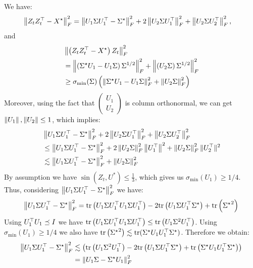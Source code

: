 We have: 
\begin{align*}
\left\| {Z}_t {Z}_t^{\top } - {X}^\star \right\|_F^2 &= \left\|U_1 \Sigma U_1^{\top} - {{\Sigma}^\star} \right\|_F^2 + 2 \left\|U_2 \Sigma U_1^{\top}\right\|_F^2 + \left\|U_2 \Sigma U_2^{\top}\right\|_F^2,
\end{align*}
and
\begin{align*}
& \left\| \left( {Z}_t {Z}_t^{\top } - {X}^\star  \right) {Z}_t \right\|_F^2
\\
&= \left\| \left({{\Sigma}^\star} U_1 - U_1 {\Sigma} \right) {\Sigma}^{1/2} \right\|_F^2 + \left\| \left(U_2 {\Sigma} \right) {\Sigma}^{1/2} \right\|_F^2 
\\
& \geq \sigma_{\min}({\Sigma}) \left(  \left\|{{\Sigma}^\star} U_1 - U_1 {\Sigma}\right\|_F^2 + \left\| U_2 {\Sigma}\right\|_F^2 \right)
\end{align*}
Moreover, using the fact that $\begin{pmatrix} U_1 \\ U_2\end{pmatrix}$ is column orthonormal, we can get $\left\|U_1\right\|, \left\|U_2\right\| \leq 1$, which implies:
\begin{align*}
& \left\|U_1 \Sigma U_1^{\top} - {{\Sigma}^\star} \right\|_F^2 + 2 \left\|U_2 \Sigma U_1^{\top}\right\|_F^2 + \left\|U_2 \Sigma U_2^{\top}\right\|_F^2
\\
& \leq \left\|U_1 \Sigma U_1^{\top} - {{\Sigma}^\star} \right\|_F^2 + 2 \left\|U_2 \Sigma \right\|_F^2 \left\|U_1^{\top}\right\|^2 + \left\|U_2 \Sigma \right\|_F^2 \|U_2^{\top}\|^2
 \\
 & \lesssim \left\|U_1 \Sigma U_1^{\top} - {{\Sigma}^\star} \right\|_F^2  + \left\|U_2 \Sigma\right\|_F^2
\end{align*}
By assumption we have $\sin(Z_t, U^*) \leq \frac{1}{3}$, which gives us $\sigma_{\min}(U_1) \geq 1/4$. Thus, considering  $ \left\|U_1 \Sigma U_1^{\top} - {{\Sigma}^\star} \right\|_F^2$ we have:
\begin{align*}
 \left\|U_1 \Sigma U_1^{\top} - {{\Sigma}^\star} \right\|_F^2 
= \textup{tr}\left(U_1 {\Sigma} U_1^{\top} U_1 {\Sigma} U_1^{\top}\right) - 2 \textup{tr}\left(U_1 {\Sigma} U_1^{\top} {{\Sigma}^\star}\right) + \textup{tr}\left({{\Sigma}^\star}^2 \right)
\end{align*}
Using $U_1^{\top} U_1 \preceq {I}$ we have $ \textup{tr}\left(U_1 {\Sigma} U_1^{\top} U_1 {\Sigma} U_1^{\top}\right) \leq  \textup{tr}\left(U_1 {\Sigma}^2 U_1^{\top}\right)$. Using $\sigma_{\min}(U_1) \geq 1/4$ we also have $ \textup{tr}\left({{\Sigma}^\star}^2 \right) \lesssim \textup{tr}({{\Sigma}^\star} {U}_1 {U}_1^{\top} {{\Sigma}^\star})$. Therefore we obtain:
\begin{align*}
 \left\|U_1 \Sigma U_1^{\top} - {{\Sigma}^\star} \right\|_F^2
& \lesssim \left( \textup{tr}\left(U_1 {\Sigma}^2 U_1^{\top}\right) - 2 \textup{tr}\left(U_1 {\Sigma} U_1^{\top} {{\Sigma}^\star}\right) + \textup{tr}\left({{\Sigma}^\star} {U}_1 {U}_1^{\top} {{\Sigma}^\star}\right) \right)
\\
&= \left\|U_1 {\Sigma} - {{\Sigma}^\star} U_1\right\|_F^2
\end{align*}
